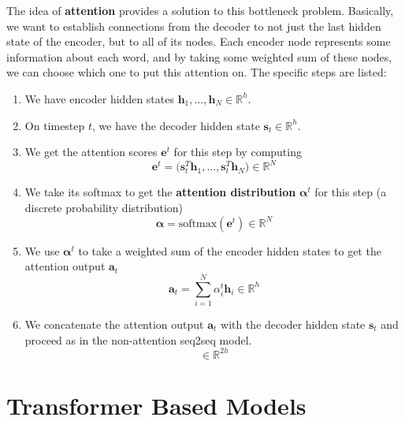 \documentclass{article}
\begin{document}
    The idea of \textbf{attention} provides a solution to this bottleneck problem. Basically, we want to establish connections from the decoder to not just the last hidden state of the encoder, but to all of its nodes. Each encoder node represents some information about each word, and by taking some weighted sum of these nodes, we can choose which one to put this attention on. The specific steps are listed: 
    \begin{enumerate}
        \item We have encoder hidden states $\mathbf{h}_1, \ldots, \mathbf{h}_N \in \mathbb{R}^h$. 
        \item On timestep $t$, we have the decoder hidden state $\mathbf{s}_t \in \mathbb{R}^h$.  
        \item We get the attention scores $\mathbf{e}^t$ for this step by computing 
        \begin{equation}
          \mathbf{e}^t = \big( \mathbf{s}_t^T \mathbf{h}_1 , \ldots, \mathbf{s}_t^T \mathbf{h}_N \big) \in \mathbb{R}^N
        \end{equation}
        \item We take its softmax to get the \textbf{attention distribution} $\boldsymbol{\alpha}^t$ for this step (a discrete probability distribution) 
        \begin{equation}
          \boldsymbol{\alpha} = \mathrm{softmax} (\mathbf{e}^t) \in \mathbb{R}^N
        \end{equation}

        \item We use $\boldsymbol{\alpha}^t$ to take a weighted sum of the encoder hidden states to get the attention output $\mathbf{a}_t$ 
        \begin{equation}
          \mathbf{a}_t = \sum_{i=1}^N \alpha_i^t \mathbf{h}_i \in \mathbb{R}^h
        \end{equation}

        \item We concatenate the attention output $\mathbf{a}_t$ with the decoder hidden state $\mathbf{s}_t$ and proceed as in the non-attention seq2seq model. 
        \begin{equation}
          [\mathbf{a}_t ; \mathbf{s}_t ] \in \mathbb{R}^{2h}
        \end{equation}
    \end{enumerate}

\section{Transformer Based Models}



\end{document}
